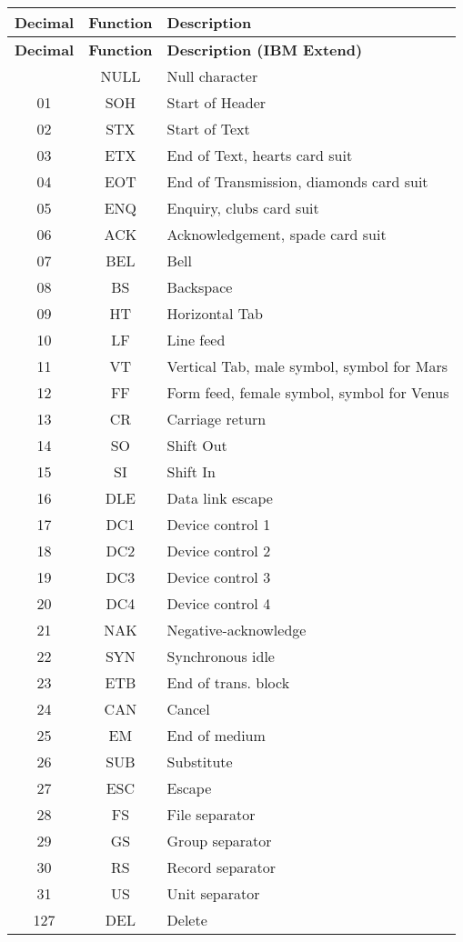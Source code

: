 \begin{center}\begin{longtable}{|c|c|l|}
	\hline
	\textbf{Decimal} & \textbf{Function} & \textbf{Description} \\
	\hline\endfirsthead\hline
	\textbf{Decimal} & \textbf{Function} & \textbf{Description (IBM Extend)} \\
	\hline\endhead\hline\endfoot\hline\endlastfoot
00 & NULL & Null character \\\hline
01 & SOH  & Start of Header \\\hline
02 & STX  & Start of Text \\\hline
03 & ETX  & End of Text, hearts card suit \\\hline
04 & EOT  & End of Transmission, diamonds card suit \\\hline
05 & ENQ  & Enquiry, clubs card suit \\\hline
06 & ACK  & Acknowledgement, spade card suit \\\hline
07 & BEL  & Bell \\\hline
08 & BS   & Backspace \\\hline
09 & HT   & Horizontal Tab \\\hline
10 & LF   & Line feed \\\hline
11 & VT   & Vertical Tab, male symbol, symbol for Mars \\\hline
12 & FF   & Form feed, female symbol, symbol for Venus \\\hline
13 & CR   & Carriage return \\\hline
14 & SO   & Shift Out \\\hline
15 & SI   & Shift In \\\hline
16 & DLE  & Data link escape \\\hline
17 & DC1  & Device control 1 \\\hline
18 & DC2  & Device control 2 \\\hline
19 & DC3  & Device control 3 \\\hline
20 & DC4  & Device control 4 \\\hline
21 & NAK  & Negative-acknowledge \\\hline
22 & SYN  & Synchronous idle \\\hline
23 & ETB  & End of trans. block \\\hline
24 & CAN  & Cancel \\\hline
25 & EM   & End of medium \\\hline
26 & SUB  & Substitute \\\hline
27 & ESC  & Escape \\\hline
28 & FS   & File separator \\\hline
29 & GS   & Group separator \\\hline
30 & RS   & Record separator \\\hline
31 & US   & Unit separator \\\hline
127 & DEL & Delete \\\hline
\end{longtable}\end{center}


